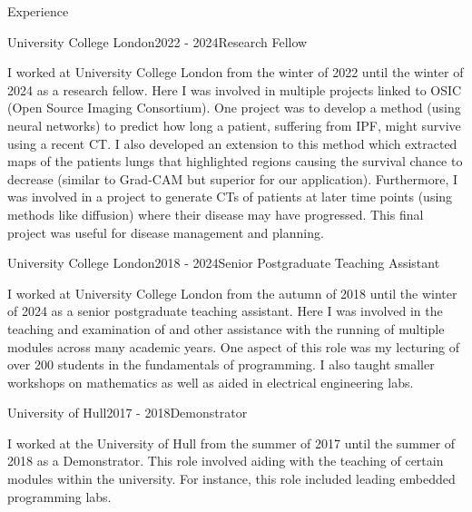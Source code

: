 \documentclass{cv}
\begin{document}
    \begin{rSection}{Experience}
        \item \begin{rSubsection}{University College London}{2022 - 2024}{Research Fellow}{}
            \item I worked at University College London from the winter of 2022 until the winter of 2024 as a research fellow. Here I was involved in multiple projects linked to OSIC (Open Source Imaging Consortium). One project was to develop a method (using neural networks) to predict how long a patient, suffering from IPF, might survive using a recent CT. I also developed an extension to this method which extracted maps of the patients lungs that highlighted regions causing the survival chance to decrease (similar to Grad-CAM but superior for our application). Furthermore, I was involved in a project to generate CTs of patients at later time points (using methods like diffusion) where their disease may have progressed. This final project was useful for disease management and planning.
        \end{rSubsection}
        
        \item \begin{rSubsection}{University College London}{2018 - 2024}{Senior Postgraduate Teaching Assistant}{}
            \item I worked at University College London from the autumn of 2018 until the winter of 2024 as a senior postgraduate teaching assistant. Here I was involved in the teaching and examination of and other assistance with the running of multiple modules across many academic years. One aspect of this role was my lecturing of over 200 students in the fundamentals of programming. I also taught smaller workshops on mathematics as well as aided in electrical engineering labs.
        \end{rSubsection}
        
        \item \begin{rSubsection}{University of Hull}{2017 - 2018}{Demonstrator}{}
            \item I worked at the University of Hull from the summer of 2017 until the summer of 2018 as a Demonstrator. This role involved aiding with the teaching of certain modules within the university. For instance, this role included leading embedded programming labs.
        \end{rSubsection}
        

\end{rSection}
\end{document}
